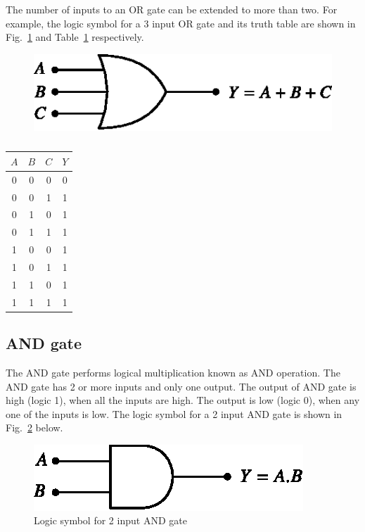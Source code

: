 The number of inputs to an OR gate can be extended to more than two. For example, the logic symbol for a 3 input OR gate and its truth table are shown in Fig.~\ref{fig5.9} and Table~\ref{tab5.12} respectively.
\begin{figure}[H]
\centering
\includegraphics{chap5/fig5.10.eps}
\caption{}\label{fig5.9}
\end{figure}

\vfill\eject

\begin{table}[H]
\centering
\caption{}\label{tab5.12}
\tabcolsep=10pt
\renewcommand{\arraystretch}{1.1}
\begin{tabular}{|ccc|c|}
\hline
\boldmath$A$ & \boldmath$B$ & \boldmath$C$ & \boldmath$Y$\\
\hline
0 & 0 & 0 & 0\\
0 & 0 & 1 & 1\\
0 & 1 & 0 & 1\\
0 & 1 & 1 & 1\\
1 & 0 & 0 & 1\\
1 & 0 & 1 & 1\\
1 & 1 & 0 & 1\\
1 & 1 & 1 & 1\\
\hline
\end{tabular}
\end{table}

\subsection{AND gate}\label{sec5.14.2}

The AND gate performs logical multiplication known as AND operation. The AND gate has 2 or more inputs and only one output. The output of AND gate is high (logic 1), when all the inputs are high. The output is low (logic 0), when any one of the inputs is low. The logic symbol for a 2 input AND gate is shown in Fig.~\ref{fig5.10} below.
\begin{figure}[H]
\centering
\includegraphics{chap5/fig5.11.eps}
\caption{Logic symbol for 2 input AND gate}\label{fig5.10}
\end{figure}

